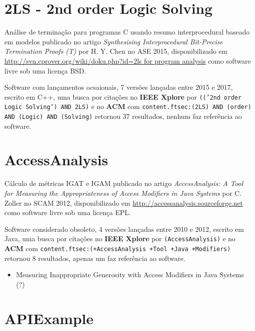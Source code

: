 

\label{softwares-summary}

\section{2LS - 2nd order Logic Solving}

Análise de terminação para programas C usando resumo interprocedural baseado em modelos
publicado no artigo {\it Synthesising Interprocedural Bit-Precise Termination Proofs (T)}
por H. Y. Chen
no ASE 2015,
disponibilizado em \url{http://svn.cprover.org/wiki/doku.php?id=2ls for program analysis}
como software livre
sob uma licença BSD.

Software com lançamentos ocsaionais,
7 versões lançadas
entre 2015 e 2017,
escrito em C++,
uma busca por citações no {\bf IEEE Xplore} por
\texttt{(('2nd order Logic Solving') AND 2LS)}
e no {\bf ACM} com
\texttt{content.ftsec:(2LS) AND (order) AND (Logic) AND (Solving)}
retornou
37 resultados,
nenhum faz referência ao software.


\section{AccessAnalysis}

Cálculo de métricas IGAT e IGAM
publicado no artigo {\it AccessAnalysis: A Tool for Measuring the Appropriateness of Access Modifiers in Java Systems}
por C. Zoller
no SCAM 2012,
disponibilizado em \url{http://accessanalysis.sourceforge.net}
como software livre
sob uma licença EPL.

Software considerado obsoleto,
4 versões lançadas
entre 2010 e 2012,
escrito em Java,
uma busca por citações no {\bf IEEE Xplore} por
\texttt{(AccessAnalysis)}
e no {\bf ACM} com
\texttt{content.ftsec:(+AccessAnalysis +Tool +Java +Modifiers)}
retornou
8 resultados,
apenas um faz referência ao software.

\begin{itemize}
\item Measuring Inappropriate Generosity with Access Modifiers in Java Systems (?)
\end{itemize}

\section{APIExample}

